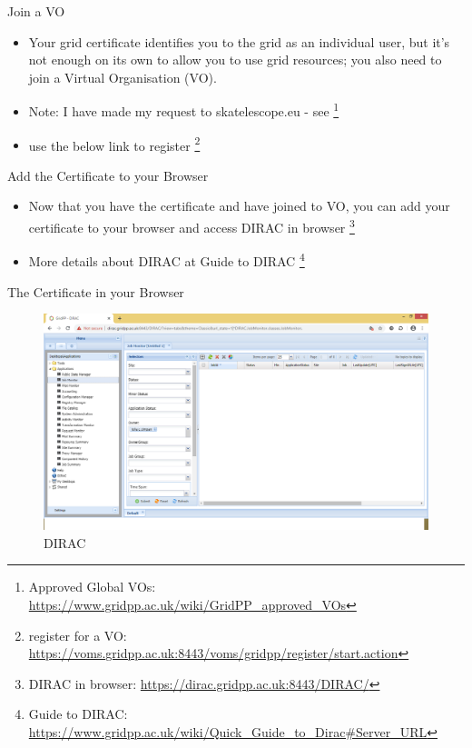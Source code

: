\documentclass{beamer}
\begin{document}
\begin{frame}{Join a VO}
\begin{center}
    \begin{itemize}
 \item Your grid certificate identifies you to the grid as an individual user, but it's not enough on its own to allow you to use grid resources; you also need to join a Virtual Organisation (VO). 
\item Note: I have made my request to skatelescope.eu - see  \footnote{Approved Global VOs:
\url{https://www.gridpp.ac.uk/wiki/GridPP_approved_VOs}}
\item use the below link to register \footnote{register for a VO: \url{https://voms.gridpp.ac.uk:8443/voms/gridpp/register/start.action}}
\end{itemize}
\end{center}
\end{frame}

\begin{frame}{Add the Certificate to your Browser}
\begin{center}

\begin{itemize}
\item Now that you have the certificate and have joined to VO, you can add your certificate to your
browser and access DIRAC in browser \footnote{DIRAC in browser: \url{https://dirac.gridpp.ac.uk:8443/DIRAC/}}
\item More details about DIRAC at Guide to DIRAC \footnote{Guide to DIRAC: \url{https://www.gridpp.ac.uk/wiki/Quick_Guide_to_Dirac#Server_URL}}
\end{itemize}
\end{center}
\end{frame}


\begin{frame}{The Certificate in your Browser}
\begin{center}
  \begin{figure}
\includegraphics[scale=0.5]{DIRAC.png}
\caption{DIRAC}
\end{figure}
\end{center}
\end{frame}
\end{document}

